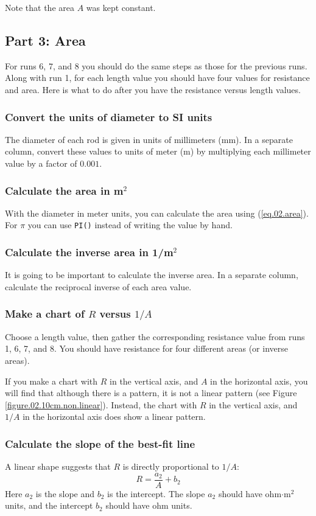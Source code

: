 Note that the area $A$ was kept constant.
%
\subsection{Part 3: Area}
%
For runs 6, 7, and 8 you should do the same steps as those for the previous runs. Along with run 1, for each length value you should have four values for resistance and area. Here is what to do after you have the resistance versus length values.
%
\subsubsection{Convert the units of diameter to SI units}
%
The diameter of each rod is given in units of millimeters (mm). In a separate column, convert these values to units of meter (m) by multiplying each millimeter value by a factor of $0.001$.
%
\subsubsection{Calculate the area in m$^{2}$}
%
With the diameter in meter units, you can calculate the area using (\ref{eq.02.area}). For $\pi$ you can use \texttt{PI()} instead of writing the value by hand.
%
\subsubsection{Calculate the inverse area in 1/m$^{2}$}
%
It is going to be important to calculate the inverse area. In a separate column, calculate the reciprocal inverse of each area value.
%
\subsubsection{Make a chart of $R$ versus $1/A$}
%
Choose a length value, then gather the corresponding resistance value from runs 1, 6, 7, and 8. You should have resistance for four different areas (or inverse areas).

If you make a chart with $R$ in the vertical axis, and $A$ in the horizontal axis, you will find that although there is a pattern, it is not a linear pattern (see Figure \ref{figure.02.10cm.non.linear}). Instead, the chart with $R$ in the vertical axis, and $1/A$ in the horizontal axis does show a linear pattern.
%
\subsubsection{Calculate the slope of the best-fit line}
%
A linear shape suggests that $R$ is directly proportional to $1/A$:
\begin{equation}
	R = \frac{a_{2}}{A} + b_{2}
\end{equation}
Here $a_{2}$ is the slope and $b_{2}$ is the intercept. The slope $a_{2}$ should have ohm$\cdot$m$^{2}$ units, and the intercept $b_{2}$ should have ohm units.

